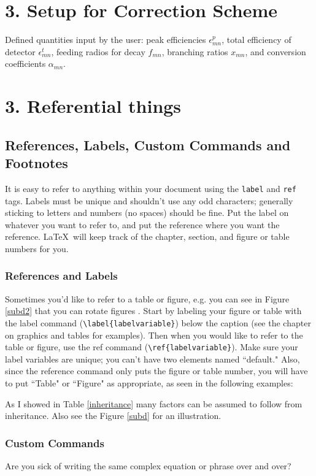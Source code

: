 \documentclass[12pt,twoside]{reedthesis}
\begin{document}
\chapter{3. Setup for Correction Scheme}
Defined quantities input by the user:
peak efficiencies $\epsilon^{p}_{mn}$, total efficiency of detector $\epsilon^{t}_{mn}$, feeding radios for decay $f_{mn}$, branching ratios $x_{mn}$, and conversion coefficients $\alpha_{mn}$.


\chapter{3. Referential things}
\section{References, Labels, Custom Commands and Footnotes}
It is easy to refer to anything within your document using the \texttt{label} and \texttt{ref} tags.  Labels must be unique and shouldn't use any odd characters; generally sticking to letters and numbers (no spaces) should be fine. Put the label on whatever you want to refer to, and put the reference where you want the reference. \LaTeX\ will keep track of the chapter, section, and figure or table numbers for you. 

\subsection{References and Labels}
Sometimes you'd like to refer to a table or figure, e.g. you can see in Figure \ref{subd2} that you can rotate figures . Start by labeling your figure or table with the label command (\verb=\label{labelvariable}=) below the caption (see the chapter on graphics and tables for examples). Then when you would like to refer to the table or figure, use the ref command (\verb=\ref{labelvariable}=). Make sure your label variables are unique; you can't have two elements named ``default." Also, since the reference command only puts the figure or table number, you will have to put  ``Table" or ``Figure" as appropriate, as seen in the following examples:

 As I showed in Table \ref{inheritance} many factors can be assumed to follow from inheritance. Also see the Figure \ref{subd} for an illustration.
 
\subsection{Custom Commands}\label{commands}
Are you sick of writing the same complex equation or phrase over and over? 
\end{document}

